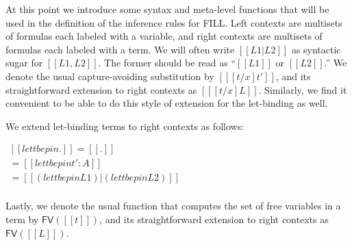 At this point we introduce some syntax and meta-level functions that
will be used in the definition of the inference rules for FILL. Left
contexts are multisets of formulas each labeled with a variable, and
right contexts are multisets of formulas each labeled with a term.  We
will often write $[[L1 | L2]]$ as syntactic sugar for $[[L1,L2]]$.
The former should be read as ``$[[L1]]$ or $[[L2]]$.''  We denote the
usual capture-avoiding substitution by $[[ [t/x]t']]$, and its
straightforward extension to right contexts as $[[ [t/x]L]]$.
Similarly, we find it convenient to be able to do this style of
extension for the let-binding as well.
\begin{definition}
  \label{def:delta-let}
  We extend let-binding terms to right contexts as follows:
  \begin{center}
    \begin{math}
      \begin{array}{lll}
        [[ let t be p in .]] = [[.]]\\
        [[ let t be p in (t' : A)]] = [[{let t be p in t'} : A]]\\
        [[ let t be p in (L1 | L2)]] = [[(let t be p in L1) | (let t be p in L2)]]\\
      \end{array}
    \end{math}
  \end{center}
\end{definition}
\noindent
Lastly, we denote the usual function that computes the set of free
variables in a term by $\mathsf{FV}([[t]])$, and its straightforward
extension to right contexts as $\mathsf{FV}([[L]])$.
